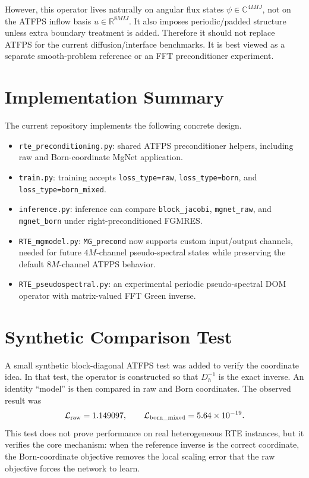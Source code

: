 \documentclass[11pt]{article}
\newcommand{\R}{\mathbb{R}}
\newcommand{\C}{\mathbb{C}}
\begin{document}
However, this operator lives naturally on angular flux states
\(\psi\in\C^{4M I J}\), not on the ATFPS inflow basis
\(u\in\R^{8M I J}\).  It also imposes periodic/padded structure unless extra
boundary treatment is added.  Therefore it should not replace ATFPS for the
current diffusion/interface benchmarks.  It is best viewed as a separate
smooth-problem reference or an FFT preconditioner experiment.

\section{Implementation Summary}

The current repository implements the following concrete design.

\begin{itemize}[leftmargin=2em]
  \item \texttt{rte\_preconditioning.py}: shared ATFPS preconditioner helpers,
  including raw and Born-coordinate MgNet application.

  \item \texttt{train.py}: training accepts
  \texttt{loss\_type=raw}, \texttt{loss\_type=born}, and
  \texttt{loss\_type=born\_mixed}.

  \item \texttt{inference.py}: inference can compare
  \texttt{block\_jacobi}, \texttt{mgnet\_raw}, and \texttt{mgnet\_born}
  under right-preconditioned FGMRES.

  \item \texttt{RTE\_mgmodel.py}: \texttt{MG\_precond} now supports custom
  input/output channels, needed for future \(4M\)-channel pseudo-spectral
  states while preserving the default \(8M\)-channel ATFPS behavior.

  \item \texttt{RTE\_pseudospectral.py}: an experimental periodic
  pseudo-spectral DOM operator with matrix-valued FFT Green inverse.
\end{itemize}

\section{Synthetic Comparison Test}

A small synthetic block-diagonal ATFPS test was added to verify the coordinate
idea.  In that test, the operator is constructed so that \(D_h^{-1}\) is the
exact inverse.  An identity ``model'' is then compared in raw and Born
coordinates.  The observed result was
\[
  \mathcal{L}_{\rm raw}=1.149097,
  \qquad
  \mathcal{L}_{\rm born\_mixed}=5.64\times 10^{-19}.
\]
This test does not prove performance on real heterogeneous RTE instances, but
it verifies the core mechanism: when the reference inverse is the correct
coordinate, the Born-coordinate objective removes the local scaling error that
the raw objective forces the network to learn.
\end{document}
